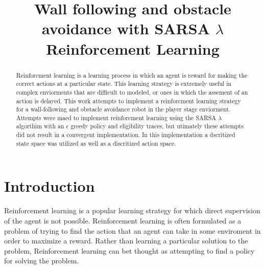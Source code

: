 \documentclass[conference]{IEEEtran}
\begin{document}
%
\title{Wall following and obstacle avoidance with SARSA $\lambda$ Reinforcement Learning}


\author{
}



\maketitle


\begin{abstract}
\boldmath
Reinforcment learning is a learning process in which an agent is reward for making the correct actions at a particular state. 
This learning strategy is extremely useful in complex enviorments that are difficult to modeled, or ones in which the assement of an action is delayed.
This work attempts to implement a reinforcment learning strategy for a wall-following and obstacle avoidance robot in the player stage enviorment.
Attempts were maed to implement reinforcment learning using the SARSA $\lambda$ algorthim with an $\epsilon$ greedy policy and eligibility traces, but utimately these attempts did not result in a convergent implementation.
In this implementation a dscritized state space was utilized as well as a discritized action space.
\end{abstract}
\IEEEpeerreviewmaketitle



\section{Introduction}

Reinforcement learning is a popular learning strategy for which direct supervision of the agent is not possible. 
Reinforcement learning is often formulated as a problem of trying to find the action that an agent can take in some enviroment in order to maximize a reward.
Rather than learning a particular solution to the problem, Reinforcement learning can bet thought as attempting to find a policy for solving the problem.  
\end{document}
